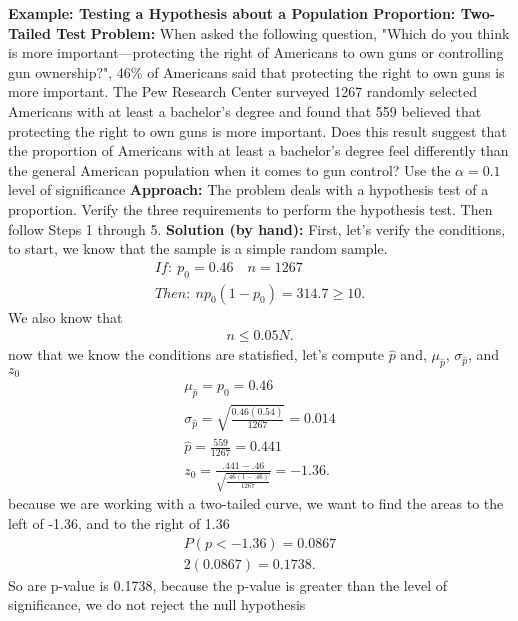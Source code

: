 \documentclass{report}
\begin{document}
    \pagebreak \bigbreak \noindent 
    \bigbreak \noindent 
    \begin{mdframed}
      \textbf{Example: Testing a Hypothesis about a Population Proportion: Two-Tailed Test}
      \bigbreak \noindent 
      \textbf{Problem:}
      When asked the following question, "Which do you think is more important—protecting the right of Americans to own guns or controlling gun ownership?", 46\% of Americans said that protecting the right to own guns is more important. The Pew Research Center surveyed 1267 randomly selected Americans with at least a bachelor's degree and found that 559 believed that protecting the right to own guns is more important. Does this result suggest that the proportion of Americans with at least a bachelor's degree feel differently than the general American population when it comes to gun control? Use the $\alpha=0.1$ level of significance
      \bigbreak \noindent 
      \textbf{Approach:}
      The problem deals with a hypothesis test of a proportion. Verify the three requirements to perform the hypothesis test. Then follow Steps 1 through 5.
      \bigbreak \noindent 
      \textbf{Solution (by hand):}
      \bigbreak \noindent 
      First, let's verify the conditions, to start, we know that the sample is a simple random sample.
      \begin{align*}
          If:\ p_{0} = 0.46 \quad n = 1267 \\
          Then:\ np_{0}(1-p_{0}) = 314.7 \geq 10
      .\end{align*}
      We also know that 
      \begin{align*}
          n \leq 0.05N
      .\end{align*}
      \bigbreak \noindent 
      now that we know the conditions are statisfied, let's compute $\hat{p}$ and, $\mu_{\hat{p}}$, $\sigma_{\hat{p}} $, and $z_{0} $
      \begin{align*}
          \mu_{\hat{p}} = p_{0} = 0.46 \\
          \sigma_{\hat{p}} = \sqrt{\frac{0.46(0.54)}{1267}} = 0.014 \\
          \hat{p} = \frac{559}{1267} = 0.441 \\
          z_{0} = \frac{.441 - .46}{\sqrt{\frac{.46(1-.46)}{1267}}} = -1.36
      .\end{align*}
      \bigbreak \noindent 
      because we are working with a two-tailed curve, we want to find the areas to the left of -1.36, and to the right of 1.36
      \begin{align*}
          P(p<-1.36) = 0.0867 \\
          2(0.0867) = 0.1738
      .\end{align*}
      \bigbreak \noindent 
      So are p-value is 0.1738, because the p-value is greater than the level of significance, we do not reject the null hypothesis
      \bigbreak \noindent 
    \end{mdframed}
\end{document}
